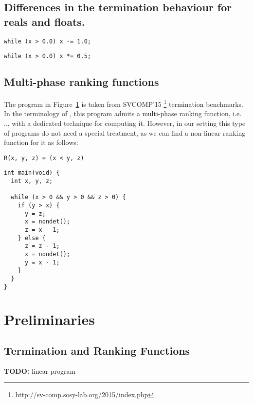 \documentclass[preprint]{sigplanconf}
\theoremstyle{definition}
\newcommand{\todo}[1]{{\bf TODO:} #1}
\begin{document}
\subsection{Differences in the termination behaviour for reals and floats.}
\begin{lstlisting}
while (x > 0.0) x -= 1.0;
\end{lstlisting}

\begin{lstlisting}
while (x > 0.0) x *= 0.5;
\end{lstlisting}


\subsection{Multi-phase ranking functions}
The program in Figure~\ref{} is taken from SVCOMP'15  \footnote{http://sv-comp.sosy-lab.org/2015/index.php} termination benchmarks.
In the terminology of \cite{DBLP:conf/tacas/LeikeH14}, this program admits a multi-phase ranking function, i.e. ..,  with a dedicated technique for computing it. However, in our setting 
this type of programs do not need a special treatment, as we can find a non-linear ranking function for it as follows:
\begin{verbatim}
R(x, y, z) = (x < y, z)
\end{verbatim}


\begin{lstlisting}
int main(void) {
  int x, y, z;

  while (x > 0 && y > 0 && z > 0) {
    if (y > x) {
      y = z;
      x = nondet();
      z = x - 1;
    } else {
      z = z - 1;
      x = nondet();
      y = x - 1;
    }
  }
}
\end{lstlisting}



\section{Preliminaries}
\subsection{Termination and Ranking Functions} \label{sec:ranking.functions}
\todo{linear program}
\end{document}
